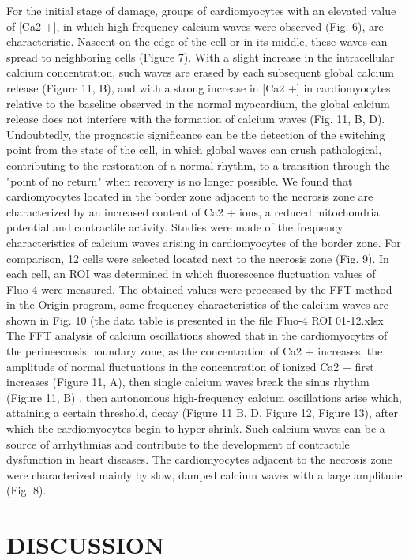 \documentclass[a4paper,12pt]{article}
\begin{document}
For the initial stage of damage, groups of cardiomyocytes with an elevated value of [Ca2 +], in which high-frequency calcium waves were observed (Fig. 6), are characteristic. Nascent on the edge of the cell or in its middle, these waves can spread to neighboring cells (Figure 7). With a slight increase in the intracellular calcium concentration, such waves are erased by each subsequent global calcium release (Figure 11, B), and with a strong increase in [Ca2 +] in cardiomyocytes relative to the baseline observed in the normal myocardium, the global calcium release does not interfere with the formation of calcium waves (Fig. 11, B, D). Undoubtedly, the prognostic significance can be the detection of the switching point from the state of the cell, in which global waves can crush pathological, contributing to the restoration of a normal rhythm, to a transition through the "point of no return" when recovery is no longer possible.
We found that cardiomyocytes located in the border zone adjacent to the necrosis zone are characterized by an increased content of Ca2 + ions, a reduced mitochondrial potential and contractile activity. Studies were made of the frequency characteristics of calcium waves arising in cardiomyocytes of the border zone. For comparison, 12 cells were selected located next to the necrosis zone (Fig. 9). In each cell, an ROI was determined in which fluorescence fluctuation values of Fluo-4 were measured. The obtained values were processed by the FFT method in the Origin program, some frequency characteristics of the calcium waves are shown in Fig. 10 (the data table is presented in the file Fluo-4 ROI 01-12.xlsx
The FFT analysis of calcium oscillations showed that in the cardiomyocytes of the perineecrosis boundary zone, as the concentration of Ca2 + increases, the amplitude of normal fluctuations in the concentration of ionized Ca2 + first increases (Figure 11, A), then single calcium waves break the sinus rhythm (Figure 11, B) ,
then autonomous high-frequency calcium oscillations arise which, attaining a certain threshold, decay (Figure 11 B, D, Figure 12, Figure 13), after which the cardiomyocytes begin to hyper-shrink. Such calcium waves can be a source of arrhythmias and contribute to the development of contractile dysfunction in heart diseases.
The cardiomyocytes adjacent to the necrosis zone were characterized mainly by slow, damped calcium waves with a large amplitude (Fig. 8).

\section{DISCUSSION}
\end{document}
